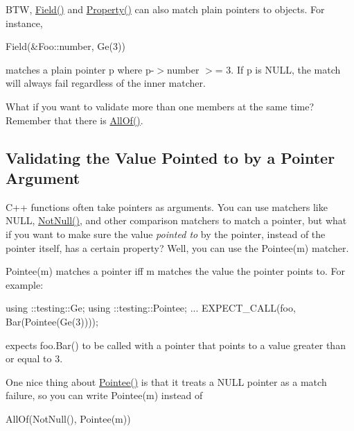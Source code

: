 B\+TW, {\ttfamily \hyperlink{namespacetesting_a4df3849391696aa93ac3a7703a717c2a}{Field()}} and {\ttfamily \hyperlink{namespacetesting_a0fad10571e23f7bc0d5c83d4c31ba740}{Property()}} can also match plain pointers to objects. For instance,


\begin{DoxyCode}
Field(&Foo::number, Ge(3))
\end{DoxyCode}


matches a plain pointer {\ttfamily p} where {\ttfamily p-\/$>$number $>$= 3}. If {\ttfamily p} is {\ttfamily N\+U\+LL}, the match will always fail regardless of the inner matcher.

What if you want to validate more than one members at the same time? Remember that there is {\ttfamily \hyperlink{namespacetesting_af7618e8606c1cb45738163688944e2b7}{All\+Of()}}.

\subsection*{Validating the Value Pointed to by a Pointer Argument}

C++ functions often take pointers as arguments. You can use matchers like {\ttfamily N\+U\+LL}, {\ttfamily \hyperlink{namespacetesting_a39d1f92b53b8b2a0b6db6a22ac146416}{Not\+Null()}}, and other comparison matchers to match a pointer, but what if you want to make sure the value {\itshape pointed to} by the pointer, instead of the pointer itself, has a certain property? Well, you can use the {\ttfamily Pointee(m)} matcher.

{\ttfamily Pointee(m)} matches a pointer iff {\ttfamily m} matches the value the pointer points to. For example\+:


\begin{DoxyCode}
using ::testing::Ge;
using ::testing::Pointee;
...
  EXPECT\_CALL(foo, Bar(Pointee(Ge(3))));
\end{DoxyCode}


expects {\ttfamily foo.\+Bar()} to be called with a pointer that points to a value greater than or equal to 3.

One nice thing about {\ttfamily \hyperlink{namespacetesting_a5122ca3533f3a00f67e146dd81f3b68c}{Pointee()}} is that it treats a {\ttfamily N\+U\+LL} pointer as a match failure, so you can write {\ttfamily Pointee(m)} instead of


\begin{DoxyCode}
AllOf(NotNull(), Pointee(m))
\end{DoxyCode}


